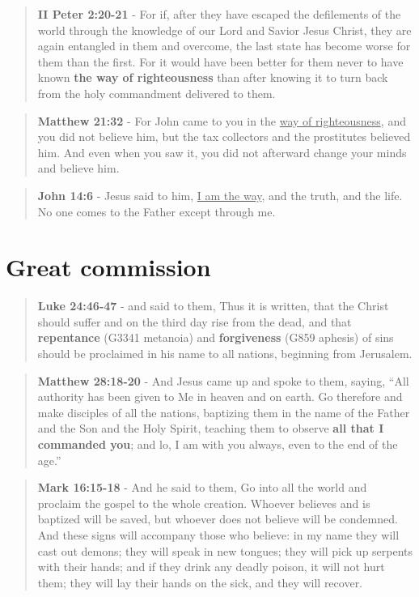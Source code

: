 \documentclass[11pt]{article}
\begin{document}
\begin{quote}
\textbf{II Peter 2:20-21} - For if, after they have escaped the defilements of the world through the knowledge of our Lord and Savior Jesus Christ, they are again entangled in them and overcome, the last state has become worse for them than the first. For it would have been better for them never to have known \textbf{the way of righteousness} than after knowing it to turn back from the holy commandment delivered to them.
\end{quote}

\begin{quote}
\textbf{Matthew 21:32} - For John came to you in the \uline{way of righteousness}, and you did not believe him, but the tax collectors and the prostitutes believed him. And even when you saw it, you did not afterward change your minds and believe him.
\end{quote}

\begin{quote}
\textbf{John 14:6} - Jesus said to him, \uline{I am the way}, and the truth, and the life. No one comes to the Father except through me.
\end{quote}

\section{Great commission}
\label{sec:orgfa24077}
\begin{quote}
\textbf{Luke 24:46-47} - and said to them, Thus it is written, that the Christ should suffer and on the third day rise from the dead, and that \textbf{repentance} (G3341 metanoia) and \textbf{forgiveness} (G859 aphesis) of sins should be proclaimed in his name to all nations, beginning from Jerusalem.
\end{quote}

\begin{quote}
\textbf{Matthew 28:18-20} - And Jesus came up and spoke to them, saying, “All authority has been given to Me in heaven and on earth. Go therefore and make disciples of all the nations, baptizing them in the name of the Father and the Son and the Holy Spirit, teaching them to observe \textbf{all that I commanded you}; and lo, I am with you always, even to the end of the age.”
\end{quote}

\begin{quote}
\textbf{Mark 16:15-18} - And he said to them, Go into all the world and proclaim the gospel to the whole creation. Whoever believes and is baptized will be saved, but whoever does not believe will be condemned. And these signs will accompany those who believe: in my name they will cast out demons; they will speak in new tongues; they will pick up serpents with their hands; and if they drink any deadly poison, it will not hurt them; they will lay their hands on the sick, and they will recover.
\end{quote}
\end{document}
